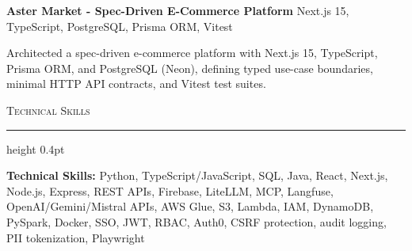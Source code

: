 \documentclass[letterpaper,11pt]{article}
\newcommand{\resumesection}[1]{%
  \par\vspace{2pt}%
  {\large\scshape #1}\par\vspace{2pt}%
  \hrule height 0.4pt\vspace{2pt}%
}
\newcommand{\projectHeading}[2]{
  \textbf{#1} \hfill #2
}
\begin{document}
\vspace{-4pt}
\projectHeading{Aster Market - Spec-Driven E-Commerce Platform}{Next.js 15, TypeScript, PostgreSQL, Prisma ORM, Vitest}
\begin{tightitemize}
  \item Architected a spec-driven e-commerce platform with Next.js 15, TypeScript, Prisma ORM, and PostgreSQL (Neon), defining typed use-case boundaries, minimal HTTP API contracts, and Vitest test suites.
\end{tightitemize}

\resumesection{Technical Skills}
\textbf{Technical Skills:} Python, TypeScript/JavaScript, SQL, Java, React, Next.js, Node.js, Express, REST APIs, Firebase, LiteLLM, MCP, Langfuse, OpenAI/Gemini/Mistral APIs, AWS Glue, S3, Lambda, IAM, DynamoDB, PySpark, Docker, SSO, JWT, RBAC, Auth0, CSRF protection, audit logging, PII tokenization, Playwright
\end{document}
